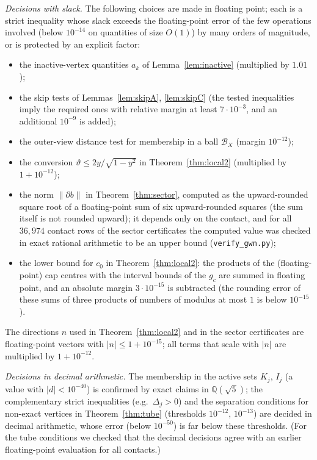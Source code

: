 \documentclass[11pt]{amsart}
\theoremstyle{definition}
\newcommand{\Q}{\mathbb{Q}}
\newcommand{\sq}{\sqrt5}
\newcommand{\abs}[1]{\lvert #1\rvert}
\newcommand{\norm}[1]{\lVert #1\rVert}
\begin{document}
\emph{Decisions with slack.} The following choices are made in floating point; each is a strict inequality whose slack
exceeds the floating-point error of the few operations involved (below $10^{-14}$ on quantities of size $O(1)$) by many
orders of magnitude, or is protected by an explicit factor:
\begin{itemize}
\item the inactive-vertex quantities $a_k$ of Lemma~\ref{lem:inactive} (multiplied by $1.01$);
\item the skip tests of Lemmas~\ref{lem:skipA}, \ref{lem:skipC} (the tested inequalities imply the required ones with
 relative margin at least $7\cdot10^{-3}$, and an additional $10^{-9}$ is added);
\item the outer-view distance test for membership in a ball $\mathcal B_X$ (margin $10^{-12}$);
\item the conversion $\vartheta\le2y/\sqrt{1-y^2}$ in Theorem~\ref{thm:local2} (multiplied by $1+10^{-12}$);
\item the norm $\norm{\partial b}$ in Theorem~\ref{thm:sector}, computed as the upward-rounded square root of a
 floating-point sum of six upward-rounded squares (the sum itself is not rounded upward); it depends only on the
 contact, and for all $36{,}974$ contact rows of the sector certificates the computed value was checked in exact
 rational arithmetic to be an upper bound (\texttt{verify\_gwn.py});
\item the lower bound for $c_0$ in Theorem~\ref{thm:local2}: the products of the (floating-point) cap centres with the
 interval bounds of the $g_c$ are summed in floating point, and an absolute margin $3\cdot10^{-15}$ is subtracted (the
 rounding error of these sums of three products of numbers of modulus at most $1$ is below $10^{-15}$).
\end{itemize}
The directions $n$ used in Theorem~\ref{thm:local2} and in the sector certificates are floating-point vectors with
$\abs n\le1+10^{-15}$; all terms that scale with $\abs n$ are multiplied by $1+10^{-12}$.

\emph{Decisions in decimal arithmetic.} The membership in the active sets $K_j$, $I_j$ (a value with $\abs d<10^{-40}$) is
confirmed by exact claims in $\Q(\sq)$; the complementary strict inequalities (e.g.\ $\Delta_j>0$) and the separation
conditions for non-exact vertices in Theorem~\ref{thm:tube} (thresholds $10^{-12}$, $10^{-13}$) are decided in decimal
arithmetic, whose error (below $10^{-50}$) is far below these thresholds. (For the tube conditions we checked that the
decimal decisions agree with an earlier floating-point evaluation for all contacts.)
\end{document}
